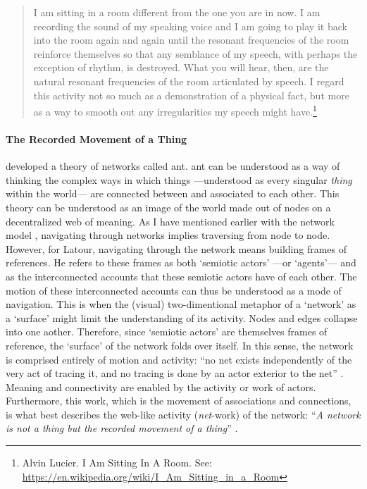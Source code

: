 \begin{quote}
	I am sitting in a room different from the one you are in now. I am recording the sound of my speaking voice and I am going to play it back into the room again and again until the resonant frequencies of the room reinforce themselves so that any semblance of my speech, with perhaps the exception of rhythm, is destroyed. What you will hear, then, are the natural resonant frequencies of the room articulated by speech. I regard this activity not so much as a demonstration of a physical fact, but more as a way to smooth out any irregularities my speech might have.\footnote{Alvin Lucier. I Am Sitting In A Room. See: \url{https://en.wikipedia.org/wiki/I_Am_Sitting_in_a_Room}}
\end{quote}


\paragraph{The Recorded Movement of a Thing}
\textcite{Lat90:On, Lat93:We} developed a theory of networks called \gls{ant}. \gls{ant} can be understood as a way of thinking the complex ways in which things ---understood as every singular \textit{thing} within the world--- are connected between and associated to each other. This theory can be understood as an image of the world made out of nodes on a decentralized web of meaning. As I have mentioned earlier with the network model , navigating through networks implies traversing from node to node. However, for Latour, navigating through the network means building frames of references. He refers to these frames as both `semiotic actors' ---or `agents'--- and as the interconnected accounts that these semiotic actors have of each other. The motion of these interconnected accounts can thus be understood as a mode of navigation. This is when the (visual) two-dimentional metaphor of a `network' as a `surface' might limit the understanding of its activity. Nodes and edges collapse into one aother. Therefore, since `semiotic actors' are themselves frames of reference, the `surface' of the network folds over itself. In this sense, the network is comprised entirely of motion and activity: ``no net exists independently of the very act of tracing it, and no tracing is done by an actor exterior to the net'' \parencite[14]{Lat90:On}. Meaning and connectivity are enabled by the activity or work of actors. Furthermore, this work, which is the movement of associations and connections, is what best describes the web-like activity (\textit{net}-work) of the network: ``\textit{A network is not a thing but the recorded movement of a thing}'' \im \parencite[14]{Lat90:On}.
 
